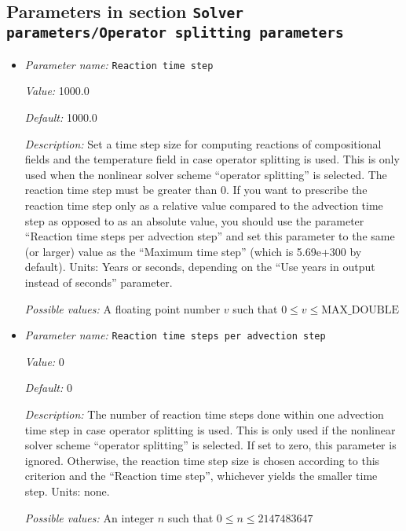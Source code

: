 \subsection{Parameters in section \tt Solver parameters/Operator splitting parameters}
\label{parameters:Solver_20parameters/Operator_20splitting_20parameters}

\begin{itemize}
\item {\it Parameter name:} {\tt Reaction time step}
\label{parameters:Solver parameters/Operator splitting parameters/Reaction time step}
\label{parameters:Solver_20parameters/Operator_20splitting_20parameters/Reaction_20time_20step}


{\it Value:} 1000.0


{\it Default:} 1000.0


{\it Description:} Set a time step size for computing reactions of compositional fields and the temperature field in case operator splitting is used. This is only used when the nonlinear solver scheme ``operator splitting'' is selected. The reaction time step must be greater than 0. If you want to prescribe the reaction time step only as a relative value compared to the advection time step as opposed to as an absolute value, you should use the parameter ``Reaction time steps per advection step'' and set this parameter to the same (or larger) value as the ``Maximum time step'' (which is 5.69e+300 by default). Units: Years or seconds, depending on the ``Use years in output instead of seconds'' parameter.


{\it Possible values:} A floating point number $v$ such that $0 \leq v \leq \text{MAX\_DOUBLE}$
\item {\it Parameter name:} {\tt Reaction time steps per advection step}
\label{parameters:Solver parameters/Operator splitting parameters/Reaction time steps per advection step}
\label{parameters:Solver_20parameters/Operator_20splitting_20parameters/Reaction_20time_20steps_20per_20advection_20step}


{\it Value:} 0


{\it Default:} 0


{\it Description:} The number of reaction time steps done within one advection time step in case operator splitting is used. This is only used if the nonlinear solver scheme ``operator splitting'' is selected. If set to zero, this parameter is ignored. Otherwise, the reaction time step size is chosen according to this criterion and the ``Reaction time step'', whichever yields the smaller time step. Units: none.


{\it Possible values:} An integer $n$ such that $0\leq n \leq 2147483647$
\end{itemize}

